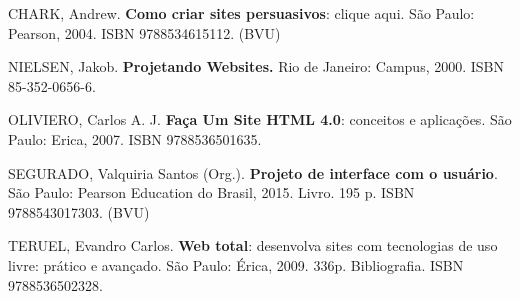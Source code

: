 \begin{pud}
	\begin{bibcomplementar}
	
 		\item CHARK, Andrew. \textbf{Como criar sites persuasivos}: clique aqui. São Paulo: Pearson, 2004. ISBN 9788534615112. (BVU)
        \item NIELSEN, Jakob. \textbf{Projetando Websites.} Rio de Janeiro: Campus, 2000. ISBN 85-352-0656-6.
        \item OLIVIERO, Carlos A. J. \textbf{Faça Um Site HTML 4.0}: conceitos e aplicações. São Paulo: Erica, 2007. ISBN 9788536501635.
        \item SEGURADO, Valquiria Santos (Org.). \textbf{Projeto de interface com o usuário}. São Paulo: Pearson Education do Brasil, 2015. Livro. 195 p. ISBN 9788543017303. (BVU)
        \item TERUEL, Evandro Carlos. \textbf{Web total}: desenvolva sites com tecnologias de uso livre: prático e avançado. São Paulo: Érica, 2009. 336p. Bibliografia. ISBN 9788536502328.	

	\end{bibcomplementar}
	
\end{pud}




